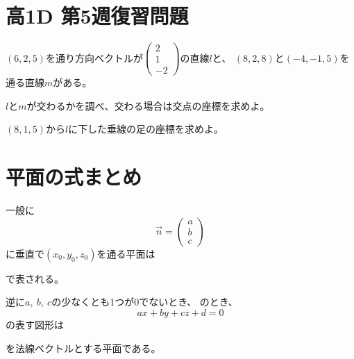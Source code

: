 \documentclass[dvipdfmx,uplatex,b5paper]{jsarticle}
\begin{document}
\section*{高1D 第5週復習問題}
$(6,2,5)$を通り方向ベクトルが$\begin{pmatrix} 2 \\ 1 \\-2 \end{pmatrix}$の直線$l$と、
$(8,2,8)$と$(-4,-1,5)$を通る直線$m$がある。
\begin{enumarabicp}
  \item $l$と$m$が交わるかを調べ、交わる場合は交点の座標を求めよ。
  \item $(8,1,5)$から$l$に下した垂線の足の座標を求めよ。
\end{enumarabicp}

\newpage
\section*{平面の式まとめ}
\vspace{\baselineskip}
\begin{enumarabicp}
  \item 一般に
    \[ \overrightarrow{n} = \begin{pmatrix}
    a \\ b \\ c
  \end{pmatrix} \]
  に垂直で$(x_0,y_0,z_0)$を通る平面は
  \begin{center}
    \framebox[6cm]{\rule[-1zw]{0pt}{3zw}}
  \end{center}
  で表される。
  \vspace{\baselineskip}
  \item 逆に$a,\ b,\ c$の少なくとも1つが0でないとき、
  のとき、
  \[ ax+by+cz+d=0 \]
  の表す図形は
  \begin{center}
  \end{center}
  を法線ベクトルとする平面である。
\end{enumarabicp}
\end{document}
